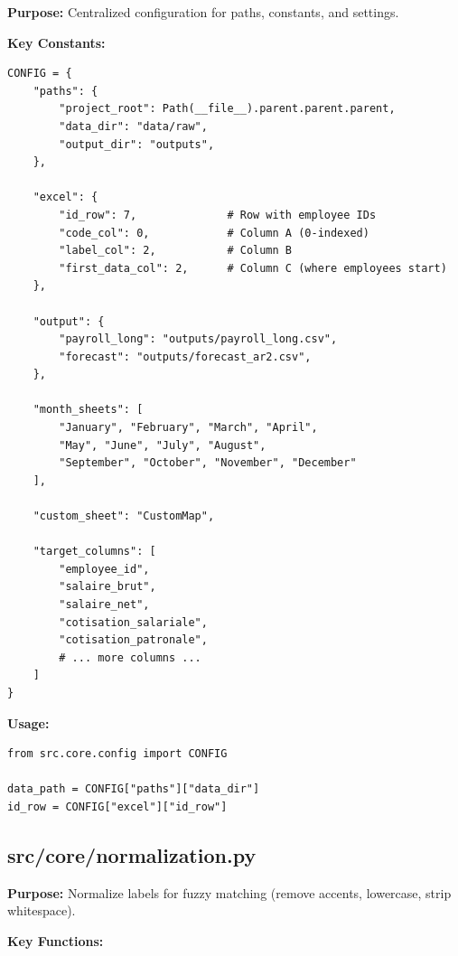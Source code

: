 \textbf{Purpose:} Centralized configuration for paths, constants, and settings.

\textbf{Key Constants:}

\begin{lstlisting}[style=pythonstyle]
CONFIG = {
    "paths": {
        "project_root": Path(__file__).parent.parent.parent,
        "data_dir": "data/raw",
        "output_dir": "outputs",
    },
    
    "excel": {
        "id_row": 7,              # Row with employee IDs
        "code_col": 0,            # Column A (0-indexed)
        "label_col": 2,           # Column B
        "first_data_col": 2,      # Column C (where employees start)
    },
    
    "output": {
        "payroll_long": "outputs/payroll_long.csv",
        "forecast": "outputs/forecast_ar2.csv",
    },
    
    "month_sheets": [
        "January", "February", "March", "April", 
        "May", "June", "July", "August", 
        "September", "October", "November", "December"
    ],
    
    "custom_sheet": "CustomMap",
    
    "target_columns": [
        "employee_id",
        "salaire_brut",
        "salaire_net",
        "cotisation_salariale",
        "cotisation_patronale",
        # ... more columns ...
    ]
}
\end{lstlisting}

\textbf{Usage:}
\begin{lstlisting}[style=pythonstyle]
from src.core.config import CONFIG

data_path = CONFIG["paths"]["data_dir"]
id_row = CONFIG["excel"]["id_row"]
\end{lstlisting}

\subsection{src/core/normalization.py}

\textbf{Purpose:} Normalize labels for fuzzy matching (remove accents, lowercase, strip whitespace).

\textbf{Key Functions:}

